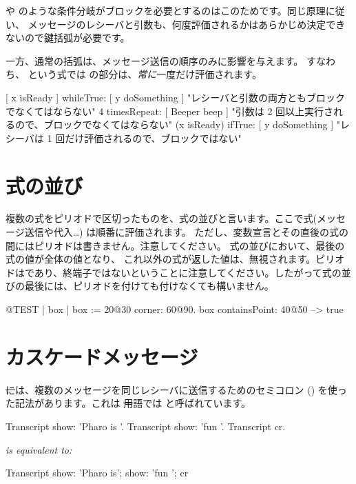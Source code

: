\documentclass[a4paper,10pt,twoside]{book}
\begin{document}
 や  のような条件分岐がブロックを必要とするのはこのためです。同じ原理に従い、 メッセージのレシーバと引数も、何度評価されるかはあらかじめ決定できないので鍵括弧が必要です。

一方、通常の括弧は、メッセージ送信の順序のみに影響を与えます。
すなわち、 という式では  の部分は、\emph{常に}一度だけ評価されます。

\begin{code}{}
[ x isReady ] whileTrue: [ y doSomething ]   "レシーバと引数の両方ともブロックでなくてはならない"
4 timesRepeat: [ Beeper beep ]                   "引数は 2 回以上実行されるので、ブロックでなくてはならない"
(x isReady) ifTrue: [ y doSomething ]           "レシーバは 1 回だけ評価されるので、ブロックではない"
\end{code}

\section{式の並び}
複数の式をピリオドで区切ったものを、式の並びと言います。ここで式(\ie メッセージ送信や代入\dots) は順番に評価されます。
ただし、変数宣言とその直後の式の間にはピリオドは書きません。注意してください。
式の並びにおいて、最後の式の値が全体の値となり、
これ以外の式が返した値は、無視されます。ピリオドはであり、終端子ではないということに注意してください。したがって式の並びの最後には、ピリオドを付けても付けなくても構いません。

\begin{code}{@TEST}
| box |
box := 20@30 corner: 60@90.
box containsPoint: 40@50 --> true
\end{code}

\section{カスケードメッセージ}
\st には、複数のメッセージを同じレシーバに送信するためのセミコロン (\ct{;}) を使った記法があります。これは \st 用語では  と呼ばれています。


\begin{minipage}{0.35\textwidth}
\begin{code}{}
Transcript show: 'Pharo is '.
Transcript show: 'fun '.
Transcript cr.
\end{code}
\end{minipage}
\emph{is equivalent to:}
\begin{minipage}{0.35\textwidth}
\begin{code}{}
Transcript        
   show: 'Pharo is';
   show: 'fun ';
   cr
\end{code}
\end{minipage}
\end{document}
